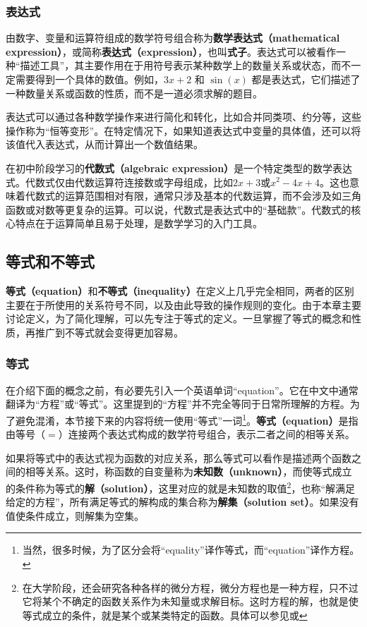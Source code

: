 \subsubsection{表达式}

由数字、变量和运算符组成的数学符号组合称为\textbf{数学表达式（mathematical expression）}，或简称\textbf{表达式（expression）}，也叫\textbf{式子}。表达式可以被看作一种“描述工具”，其主要作用在于用符号表示某种数学上的数量关系或状态，而不一定需要得到一个具体的数值。例如，$3x + 2$ 和 $\sin(x)$ 都是表达式，它们描述了一种数量关系或函数的性质，而不是一道必须求解的题目。

表达式可以通过各种数学操作来进行简化和转化，比如合并同类项、约分等，这些操作称为“恒等变形”。在特定情况下，如果知道表达式中变量的具体值，还可以将该值代入表达式，从而计算出一个数值结果。

在初中阶段学习的\textbf{代数式（algebraic expression）}是一个特定类型的数学表达式。代数式仅由代数运算符连接数或字母组成，比如$2x + 3$或$x^2 - 4x + 4$。这也意味着代数式的运算范围相对有限，通常只涉及基本的代数运算，而不会涉及如三角函数或对数等更复杂的运算。可以说，代数式是表达式中的“基础款”。代数式的核心特点在于运算简单且易于处理，是数学学习的入门工具。

\subsection{等式和不等式}

\textbf{等式（equation）}和\textbf{不等式（inequality）}在定义上几乎完全相同，两者的区别主要在于所使用的关系符号不同，以及由此导致的操作规则的变化。由于本章主要讨论定义，为了简化理解，可以先专注于等式的定义。一旦掌握了等式的概念和性质，再推广到不等式就会变得更加容易。

\subsubsection{等式}

在介绍下面的概念之前，有必要先引入一个英语单词“equation”。它在中文中通常翻译为“方程”或“等式”。这里提到的“方程”并不完全等同于日常所理解的方程。为了避免混淆，本节接下来的内容将统一使用“等式”一词\footnote{当然，很多时候，为了区分会将“equality”译作等式，而“equation”译作方程。}。\textbf{等式（equation）}是指由等号（$=$）连接两个表达式构成的数学符号组合，表示二者之间的相等关系。

如果将等式中的表达式视为函数的对应关系，那么等式可以看作是描述两个函数之间的相等关系。这时，称函数的自变量称为\textbf{未知数（unknown）}，而使等式成立的条件称为等式的\textbf{解（solution）}，这里对应的就是未知数的取值\footnote{在大学阶段，还会研究各种各样的微分方程，微分方程也是一种方程，只不过它将某个不确定的函数关系作为未知量或求解目标。这时方程的解，也就是使等式成立的条件，就是某个或某类特定的函数。具体可以参见或}，也称“解满足给定的方程”，所有满足等式的解构成的集合称为\textbf{解集（solution set）}。如果没有值使条件成立，则解集为空集。


